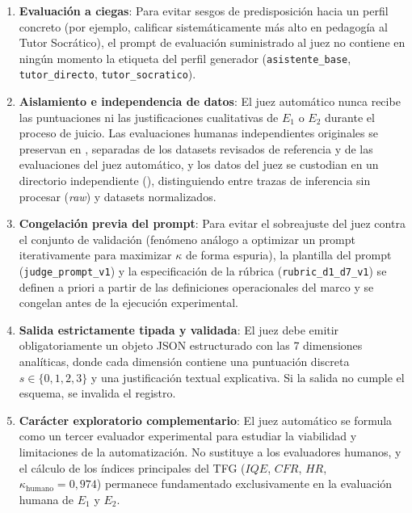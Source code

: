 \begin{enumerate}
    \item \textbf{Evaluación a ciegas}: Para evitar sesgos de predisposición hacia un perfil concreto (por ejemplo, calificar sistemáticamente más alto en pedagogía al Tutor Socrático), el prompt de evaluación suministrado al juez no contiene en ningún momento la etiqueta del perfil generador (\texttt{asistente\_base}, \texttt{tutor\_directo}, \texttt{tutor\_socratico}).
    \item \textbf{Aislamiento e independencia de datos}: El juez automático nunca recibe las puntuaciones ni las justificaciones cualitativas de $E_1$ o $E_2$ durante el proceso de juicio. Las evaluaciones humanas independientes originales se preservan en , separadas de los datasets revisados de referencia y de las evaluaciones del juez automático, y los datos del juez se custodian en un directorio independiente (), distinguiendo entre trazas de inferencia sin procesar (\textit{raw}) y datasets normalizados.
    \item \textbf{Congelación previa del prompt}: Para evitar el sobreajuste del juez contra el conjunto de validación (fenómeno análogo a optimizar un prompt iterativamente para maximizar $\kappa$ de forma espuria), la plantilla del prompt (\texttt{judge\_prompt\_v1}) y la especificación de la rúbrica (\texttt{rubric\_d1\_d7\_v1}) se definen a priori a partir de las definiciones operacionales del marco y se congelan antes de la ejecución experimental.
    \item \textbf{Salida estrictamente tipada y validada}: El juez debe emitir obligatoriamente un objeto JSON estructurado con las 7 dimensiones analíticas, donde cada dimensión contiene una puntuación discreta $s \in \{0, 1, 2, 3\}$ y una justificación textual explicativa. Si la salida no cumple el esquema, se invalida el registro.
    \item \textbf{Carácter exploratorio complementario}: El juez automático se formula como un tercer evaluador experimental para estudiar la viabilidad y limitaciones de la automatización. No sustituye a los evaluadores humanos, y el cálculo de los índices principales del TFG ($IQE$, $CFR$, $HR$, $\kappa_{\text{humano}} = 0{,}974$) permanece fundamentado exclusivamente en la evaluación humana de $E_1$ y $E_2$.
\end{enumerate}
